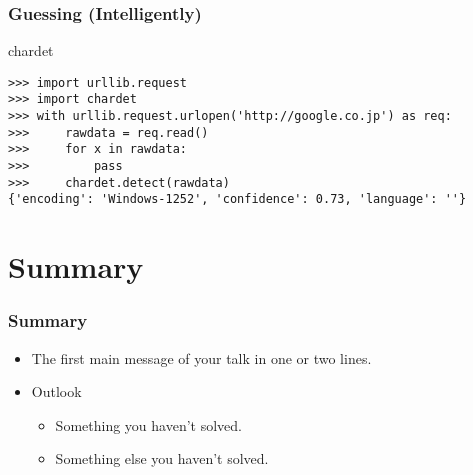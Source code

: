 \documentclass[smaller,xcolor=table,aspectratio=169]{beamer}
\begin{document}
\lstset{language=Python}

\begin{frame}[fragile]
  \frametitle{Guessing (Intelligently)}
  chardet
  \begin{lstlisting}[style=mystyle]
>>> import urllib.request
>>> import chardet
>>> with urllib.request.urlopen('http://google.co.jp') as req:
>>>     rawdata = req.read()
>>>     for x in rawdata:
>>>         pass
>>>     chardet.detect(rawdata)
{'encoding': 'Windows-1252', 'confidence': 0.73, 'language': ''}
  \end{lstlisting}

\end{frame}

\section*{Summary}

\begin{frame}
\frametitle<presentation>{Summary}

\begin{itemize}
  \item The \alert{first main message} of your talk in one or two lines.
\end{itemize}

\vfill
\begin{itemize}
  \item Outlook
  \begin{itemize}
    \item Something you haven't solved.
    \item Something else you haven't solved.
  \end{itemize}
\end{itemize}
\vfill
\end{frame}
\end{document}
